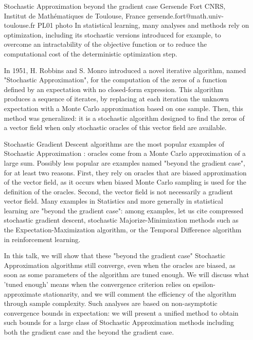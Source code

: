 \documentclass[12pt,a4paper,figuresright]{book}
\begin{document}
\begin{talk}
	{Stochastic Approximation beyond the gradient case}%
	{Gersende Fort}%
	{CNRS, Institut de Math\'ematiques de Toulouse, France}%
	{gersende.fort@math.univ-toulouse.fr}%
	{}%
	{}%
	{}%
	{PL01}%
	{photo}%
	In statistical learning, many analyses and methods rely on optimization, including its stochastic versions introduced for example, to overcome an intractability of the objective function or to reduce the computational cost of the deterministic optimization step.

In 1951, H. Robbins and S. Monro introduced a novel iterative algorithm, named "Stochastic Approximation", for the computation of the zeros of a function defined by an expectation with no closed-form expression. This algorithm produces a sequence of iterates, by replacing at each iteration the unknown expectation with a Monte Carlo approximation based on one sample. Then, this method was generalized: it is a stochastic algorithm designed to find the zeros of a vector field  when only stochastic oracles of this vector field are available.

 

Stochastic Gradient Descent algorithms are the most popular examples of Stochastic Approximation : oracles come from a Monte Carlo approximation of a large sum. Possibly less popular are examples named "beyond the gradient case", for at least two reasons. First, they rely on oracles that are biased approximation of the vector field, as it  occurs when biased Monte Carlo sampling is used for the definition of the oracles. Second, the vector field is not necessarily a gradient vector field. Many examples in Statistics and more generally in statistical learning are "beyond the gradient case": among examples, let us cite compressed stochastic gradient descent, stochastic Majorize-Minimization methods such as the Expectation-Maximization algorithm, or the Temporal Difference algorithm in reinforcement learning.

 

In this talk, we will show that these "beyond the gradient case" Stochastic Approximation algorithms  still converge, even when the oracles are biased, as soon as some parameters of the algorithm are tuned enough. We will discuss what 'tuned enough' means  when the convergence criterion relies on epsilon-approximate stationarity, and we will comment the efficiency of the algorithm through sample complexity.  Such analyses are based on non-asymptotic convergence bounds in expectation: we will present a unified method to obtain such bounds for a large class of Stochastic Approximation methods including both the gradient case and the beyond the gradient case.


\end{talk}
\end{document}
